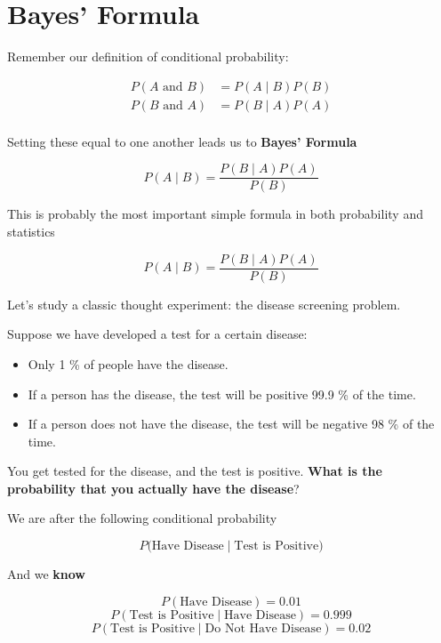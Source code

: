 \section{Bayes' Formula}

%
\begin{frame}
Remember our definition of conditional probability:

\begin{align*}
P(A \text{ and } B) &= P(A \mid B) P(B) \\
P(B \text{ and } A) &= P(B \mid A) P(A) \\
\end{align*}

Setting these equal to one another leads us to \textbf{Bayes' Formula}

$$ P(A \mid B) = \frac{ P(B \mid A) P(A) }{ P(B) } $$

\end{frame}
%

%
\begin{frame}

This is probably the most important simple formula in both probability and
statistics

$$ P(A \mid B) = \frac{ P(B \mid A) P(A) }{ P(B) } $$

\end{frame}
%

%
\begin{frame}

Let's study a classic thought experiment: the disease screening problem.

Suppose we have developed a test for a certain disease:
\begin{itemize}
\item Only 1 \% of people have the disease.
\item If a person has the disease, the test will be positive 99.9 \% of the
time.
\item If a person does not have the disease, the test will be negative 98 \% of
the time.
\end{itemize}

You get tested for the disease, and the test is positive.  \textbf{What is the
probability that you actually have the disease}?

\end{frame}
%

%
\begin{frame}
We are after the following conditional probability

$$ P(\text{Have Disease} \mid \text{Test is Positive)} $$

And we \textbf{know}

$$ P(\text{Have Disease}) = 0.01 $$
$$ P(\text{Test is Positive} \mid \text{Have Disease}) = 0.999 $$
$$ P(\text{Test is Positive} \mid \text{Do Not Have Disease}) = 0.02 $$
\end{frame}
%

